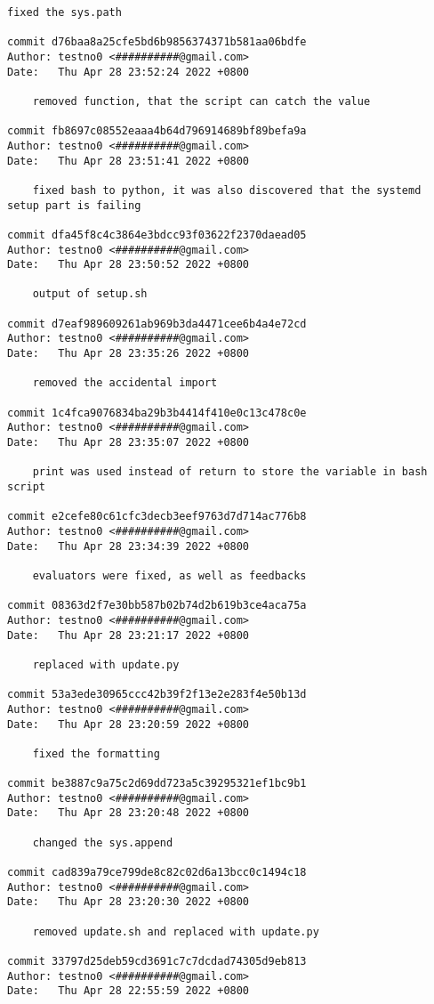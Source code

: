 \documentclass[12pt]{article}
\begin{document}
\begin{lstlisting}[caption={\texttt{git} log of the development.}]
	fixed the sys.path

commit d76baa8a25cfe5bd6b9856374371b581aa06bdfe
Author: testno0 <##########@gmail.com>
Date:   Thu Apr 28 23:52:24 2022 +0800

	removed function, that the script can catch the value

commit fb8697c08552eaaa4b64d796914689bf89befa9a
Author: testno0 <##########@gmail.com>
Date:   Thu Apr 28 23:51:41 2022 +0800

	fixed bash to python, it was also discovered that the systemd setup part is failing

commit dfa45f8c4c3864e3bdcc93f03622f2370daead05
Author: testno0 <##########@gmail.com>
Date:   Thu Apr 28 23:50:52 2022 +0800

	output of setup.sh

commit d7eaf989609261ab969b3da4471cee6b4a4e72cd
Author: testno0 <##########@gmail.com>
Date:   Thu Apr 28 23:35:26 2022 +0800

	removed the accidental import

commit 1c4fca9076834ba29b3b4414f410e0c13c478c0e
Author: testno0 <##########@gmail.com>
Date:   Thu Apr 28 23:35:07 2022 +0800

	print was used instead of return to store the variable in bash script

commit e2cefe80c61cfc3decb3eef9763d7d714ac776b8
Author: testno0 <##########@gmail.com>
Date:   Thu Apr 28 23:34:39 2022 +0800

	evaluators were fixed, as well as feedbacks

commit 08363d2f7e30bb587b02b74d2b619b3ce4aca75a
Author: testno0 <##########@gmail.com>
Date:   Thu Apr 28 23:21:17 2022 +0800

	replaced with update.py

commit 53a3ede30965ccc42b39f2f13e2e283f4e50b13d
Author: testno0 <##########@gmail.com>
Date:   Thu Apr 28 23:20:59 2022 +0800

	fixed the formatting

commit be3887c9a75c2d69dd723a5c39295321ef1bc9b1
Author: testno0 <##########@gmail.com>
Date:   Thu Apr 28 23:20:48 2022 +0800

	changed the sys.append

commit cad839a79ce799de8c82c02d6a13bcc0c1494c18
Author: testno0 <##########@gmail.com>
Date:   Thu Apr 28 23:20:30 2022 +0800

	removed update.sh and replaced with update.py

commit 33797d25deb59cd3691c7c7dcdad74305d9eb813
Author: testno0 <##########@gmail.com>
Date:   Thu Apr 28 22:55:59 2022 +0800


\end{lstlisting}
\end{document}
